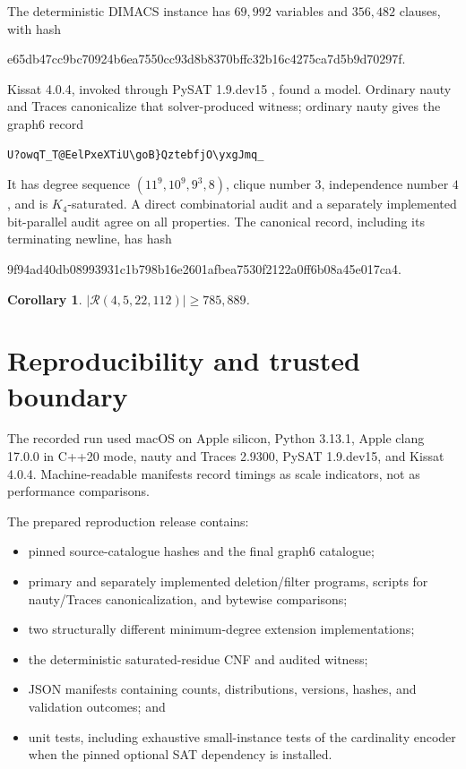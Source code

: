 \documentclass[10pt]{article}
\newtheorem{corollary}[theorem]{Corollary}
\theoremstyle{definition}
\theoremstyle{remark}
\newcommand{\Rcal}{\mathcal{R}}
\begin{document}
The deterministic DIMACS instance has $69{,}992$ variables and $356{,}482$
clauses, with hash
\begin{center}
\small\ttfamily
e65db47cc9bc70924b6ea7550cc93d8b8370bffc32b16c4275ca7d5b9d70297f.
\end{center}
Kissat 4.0.4, invoked through PySAT 1.9.dev15
\cite{kissat-2020,pysat-2018}, found a model.  Ordinary nauty and Traces
canonicalize that solver-produced witness; ordinary nauty gives the graph6
record
\begin{verbatim}
U?owqT_T@EelPxeXTiU\goB}QztebfjO\yxgJmq_
\end{verbatim}
It has degree sequence $(11^9,10^9,9^3,8)$, clique number $3$, independence
number $4$, and is $K_4$-saturated.  A direct combinatorial audit and a
separately implemented bit-parallel audit agree on all properties.  The
canonical record, including its terminating newline, has hash
\begin{center}
\small\ttfamily
9f94ad40db08993931c1b798b16e2601afbea7530f2122a0ff6b08a45e017ca4.
\end{center}

\begin{corollary}
$|\Rcal(4,5,22,112)|\geq785{,}889$.
\end{corollary}

\section{Reproducibility and trusted boundary}

The recorded run used macOS on Apple silicon, Python 3.13.1, Apple clang
17.0.0 in C++20 mode, nauty and Traces 2.9300, PySAT 1.9.dev15, and Kissat
4.0.4.  Machine-readable manifests record timings as scale indicators, not
as performance comparisons.

The prepared reproduction release contains:
\begin{itemize}[leftmargin=*,itemsep=1pt]
  \item pinned source-catalogue hashes and the final graph6 catalogue;
  \item primary and separately implemented deletion/filter programs, scripts
  for nauty/Traces canonicalization, and bytewise comparisons;
  \item two structurally different minimum-degree extension implementations;
  \item the deterministic saturated-residue CNF and audited witness;
  \item JSON manifests containing counts, distributions, versions, hashes,
  and validation outcomes; and
  \item unit tests, including exhaustive small-instance tests of the
  cardinality encoder when the pinned optional SAT dependency is installed.
\end{itemize}
\end{document}
